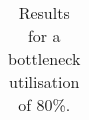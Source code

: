 \documentclass[envcountsame]{llncs}
\begin{document}
\begin{table}[tb]
\begin{center}
\begin{tabular}{c|rrr|c|c||c|c|c|c|c}
    \end{tabular}
  \end{center}
  \caption{\label{tbl:80} Results for a bottleneck utilisation of 80\%. }
\end{table}


\end{document}
